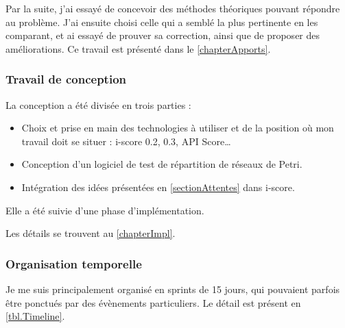 Par la suite, j'ai essayé de concevoir des méthodes théoriques pouvant répondre au problème.
J'ai ensuite choisi celle qui a semblé la plus pertinente en les comparant, et ai essayé de prouver sa correction, ainsi que de proposer des améliorations.
Ce travail est présenté dans le \cref{chapterApports}.

\subsubsection{Travail de conception}
La conception a été divisée en trois parties : 
\begin{itemize}
	\item Choix et prise en main des technologies à utiliser et de la position où mon travail doit se situer : i-score 0.2, 0.3, API Score\dots
	\item Conception d'un logiciel de test de répartition de réseaux de Petri.
	\item Intégration des idées présentées en \cref{sectionAttentes} dans i-score.
\end{itemize}

Elle a été suivie d'une phase d'implémentation.

Les détails se trouvent au \cref{chapterImpl}.

\subsubsection{Organisation temporelle}
Je me suis principalement organisé en sprints de 15 jours, qui pouvaient parfois être ponctués par des évènements particuliers. Le détail est présent en \cref{tbl.Timeline}.

